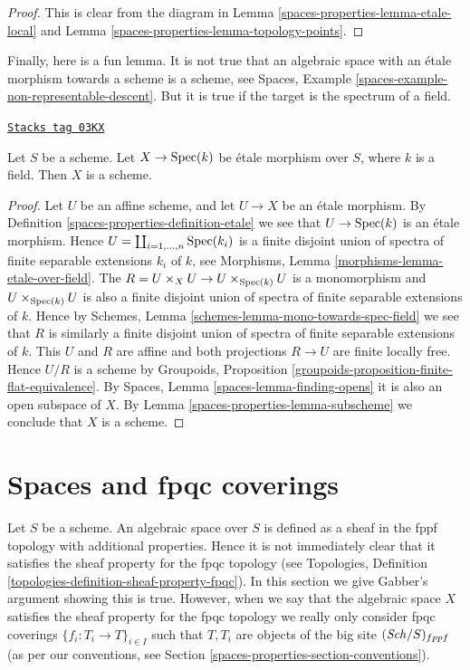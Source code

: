 \begin{proof}
This is clear from the diagram in
Lemma \ref{spaces-properties-lemma-etale-local}
and
Lemma \ref{spaces-properties-lemma-topology-points}.
\end{proof}

Finally, here is a fun lemma. It is not true that an algebraic space
with an \'etale morphism towards a scheme is a scheme, see
Spaces, Example \ref{spaces-example-non-representable-descent}.
But it is true if the target is the spectrum of a field.

\begin{lemma}
\label{spaces-properties-lemma-etale-over-field-scheme}
\href{https://stacks.math.columbia.edu/tag/03KX}{\texttt{Stacks tag 03KX}}

Let $S$ be a scheme. Let $X \to \operatorname{Spec}(k)$
be \'etale morphism over $S$, where $k$ is a field.
Then $X$ is a scheme.
\end{lemma}

\begin{proof}
Let $U$ be an affine scheme, and let $U \to X$ be an \'etale morphism. By
Definition \ref{spaces-properties-definition-etale}
we see that $U \to \operatorname{Spec}(k)$ is an \'etale
morphism. Hence $U = \coprod_{i = 1, \ldots, n} \operatorname{Spec}(k_i)$
is a finite disjoint union of spectra of finite separable extensions
$k_i$ of $k$, see
Morphisms, Lemma \ref{morphisms-lemma-etale-over-field}.
The $R = U \times_X U \to U \times_{\operatorname{Spec}(k)} U$ is a monomorphism
and $U \times_{\operatorname{Spec}(k)} U$ is also a finite disjoint union of
spectra of finite separable extensions of $k$. Hence by
Schemes, Lemma \ref{schemes-lemma-mono-towards-spec-field}
we see that $R$ is similarly a finite disjoint union of
spectra of finite separable extensions of $k$.
This $U$ and $R$ are affine and
both projections $R \to U$ are finite locally free.
Hence $U/R$ is a scheme by
Groupoids, Proposition \ref{groupoids-proposition-finite-flat-equivalence}.
By
Spaces, Lemma \ref{spaces-lemma-finding-opens}
it is also an open subspace of $X$. By
Lemma \ref{spaces-properties-lemma-subscheme}
we conclude that $X$ is a scheme.
\end{proof}

\section{Spaces and fpqc coverings}
\label{spaces-properties-section-fpqc}
Let $S$ be a scheme.
An algebraic space over $S$ is defined as a sheaf in the fppf topology with
additional properties. Hence it is not immediately clear that it satisfies
the sheaf property for the fpqc topology (see
Topologies, Definition \ref{topologies-definition-sheaf-property-fpqc}).
In this section we give Gabber's argument showing this is true.
However, when we say that the algebraic space $X$ satisfies the
sheaf property for the fpqc topology we really only consider fpqc
coverings $\{f_i : T_i \to T\}_{i \in I}$ such that $T, T_i$ are
objects of the big site $(\mathit{Sch}/S)_{fppf}$ (as per
our conventions, see Section \ref{spaces-properties-section-conventions}).

